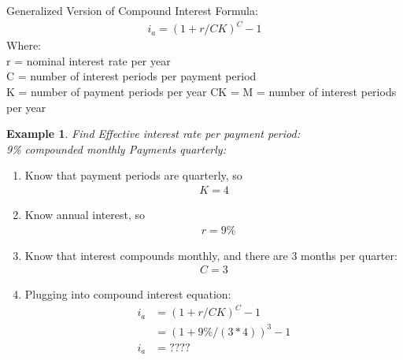 \documentclass{report} %
\newtheorem{exmp}{Example}
\begin{document}
Generalized Version of Compound Interest Formula:
\begin{equation*}
    \begin{aligned}
        i_a = (1+ r/CK)^C - 1
    \end{aligned}
\end{equation*}
Where: \\ %
r = nominal interest rate per year \\
C = number of interest periods per payment period \\
K = number of payment periods per year
CK = M = number of interest periods per year \\

\begin{exmp}
    Find Effective interest rate per payment period: \\
    9\% compounded monthly \quad Payments quarterly:
\end{exmp}
\begin{enumerate}
    \item Know that payment periods are quarterly, so
    \begin{equation*}
        \begin{aligned}
            K = 4
        \end{aligned}
    \end{equation*}
    \item Know annual interest, so 
    \begin{equation*}
        \begin{aligned}
            &r = 9\% 
        \end{aligned}
    \end{equation*}
    \item Know that interest compounds monthly, and there are 3 months per quarter:
    \begin{equation*}
        \begin{aligned}
            C = 3
        \end{aligned}
    \end{equation*}
    \item Plugging into compound interest equation:
    \begin{equation*}
        \begin{aligned}
            i_a &= (1 + r/CK)^C - 1 \\
                &= (1 + 9\%/(3*4))^3 - 1 \\
            i_a &= ???? %
        \end{aligned}
    \end{equation*}
\end{enumerate}
\end{document}
